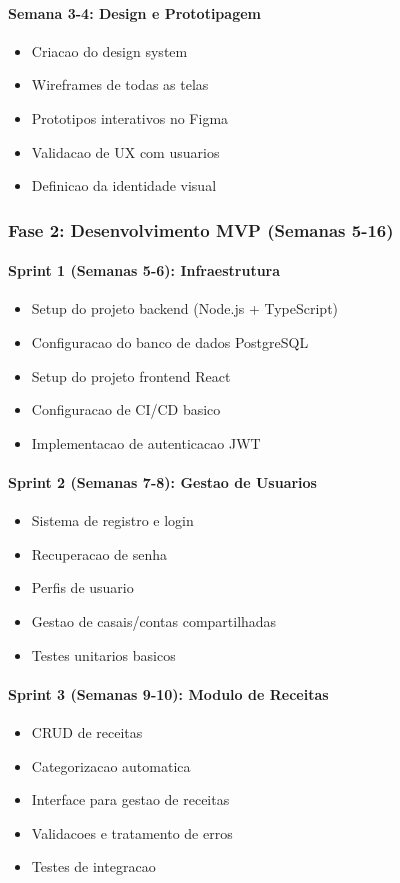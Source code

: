 \paragraph{Semana 3-4: Design e Prototipagem}
\begin{itemize}
    \item Criacao do design system
    \item Wireframes de todas as telas
    \item Prototipos interativos no Figma
    \item Validacao de UX com usuarios
    \item Definicao da identidade visual
\end{itemize}

\subsubsection{Fase 2: Desenvolvimento MVP (Semanas 5-16)}

\paragraph{Sprint 1 (Semanas 5-6): Infraestrutura}
\begin{itemize}
    \item Setup do projeto backend (Node.js + TypeScript)
    \item Configuracao do banco de dados PostgreSQL
    \item Setup do projeto frontend React
    \item Configuracao de CI/CD basico
    \item Implementacao de autenticacao JWT
\end{itemize}

\paragraph{Sprint 2 (Semanas 7-8): Gestao de Usuarios}
\begin{itemize}
    \item Sistema de registro e login
    \item Recuperacao de senha
    \item Perfis de usuario
    \item Gestao de casais/contas compartilhadas
    \item Testes unitarios basicos
\end{itemize}

\paragraph{Sprint 3 (Semanas 9-10): Modulo de Receitas}
\begin{itemize}
    \item CRUD de receitas
    \item Categorizacao automatica
    \item Interface para gestao de receitas
    \item Validacoes e tratamento de erros
    \item Testes de integracao
\end{itemize}

